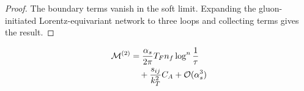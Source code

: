 \begin{proof}
The boundary terms vanish in the soft limit. Expanding the
gluon-initiated Lorentz-equivariant network to three loops and
collecting terms gives the result.
\end{proof}

\begin{align}
  \mathcal{M}^{(2)} &= \frac{\alpha_s}{2\pi} T_F n_f \log^{n} \frac{1}{\tau} \nonumber \\
  &\quad + \frac{s_{ij}}{k_T^2} C_A + \mathcal{O}(\alpha_s^3) \label{eq:1}
\end{align}

